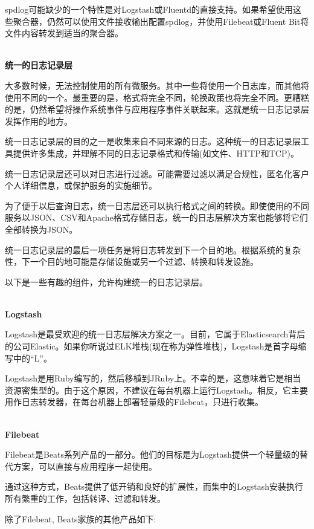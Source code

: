 spdlog可能缺少的一个特性是对Logstash或Fluentd的直接支持。如果希望使用这些聚合器，仍然可以使用文件接收输出配置spdlog，并使用Filebeat或Fluent Bit将文件内容转发到适当的聚合器。

\hspace*{\fill} \\ %
\noindent
\textbf{统一的日志记录层}

大多数时候，无法控制使用的所有微服务。其中一些将使用一个日志库，而其他将使用不同的一个。最重要的是，格式将完全不同，轮换政策也将完全不同。更糟糕的是，仍然希望将操作系统事件与应用程序事件关联起来。这就是统一日志记录层发挥作用的地方。

统一日志记录层的目的之一是收集来自不同来源的日志。这种统一的日志记录层工具提供许多集成，并理解不同的日志记录格式和传输(如文件、HTTP和TCP)。

统一日志记录层还可以对日志进行过滤。可能需要过滤以满足合规性，匿名化客户个人详细信息，或保护服务的实施细节。

为了便于以后查询日志，统一日志层还可以执行格式之间的转换。即使使用的不同服务以JSON、CSV和Apache格式存储日志，统一的日志层解决方案也能够将它们全部转换为JSON。

统一日志记录层的最后一项任务是将日志转发到下一个目的地。根据系统的复杂性，下一个目的地可能是存储设施或另一个过滤、转换和转发设施。

以下是一些有趣的组件，允许构建统一的日志记录层。

\hspace*{\fill} \\ %
\noindent
\textbf{Logstash}

Logstash是最受欢迎的统一日志层解决方案之一。目前，它属于Elasticsearch背后的公司Elastic。如果你听说过ELK堆栈(现在称为弹性堆栈)，Logstash是首字母缩写中的“L”。

Logstash是用Ruby编写的，然后移植到JRuby上。不幸的是，这意味着它是相当资源密集型的。由于这个原因，不建议在每台机器上运行Logstash。相反，它主要用作日志转发器，在每台机器上部署轻量级的Filebeat，只进行收集。

\hspace*{\fill} \\ %
\noindent
\textbf{Filebeat}

Filebeat是Beats系列产品的一部分。他们的目标是为Logstash提供一个轻量级的替代方案，可以直接与应用程序一起使用。

通过这种方式，Beats提供了低开销和良好的扩展性，而集中的Logstash安装执行所有繁重的工作，包括转译、过滤和转发。

除了Filebeat, Beats家族的其他产品如下:

